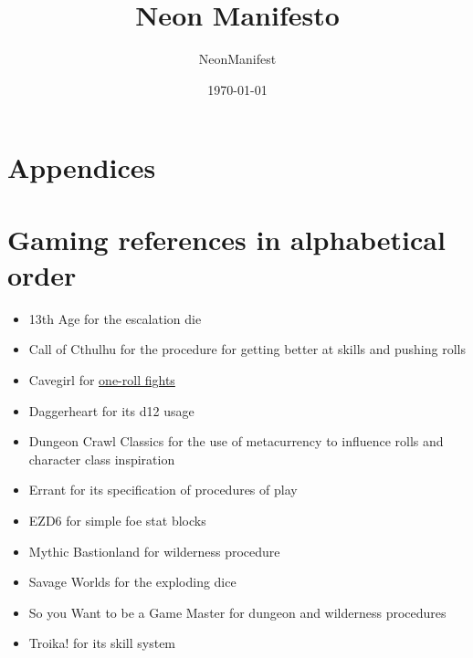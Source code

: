 \documentclass{article}
\title{Neon Manifesto}
\author{NeonManifest}
\date{\today}
\begin{document}
\maketitle

\tableofcontents









\appendix
\section*{Appendices}
\section{Gaming references in alphabetical order}
\begin{itemize}
    \item 13th Age for the escalation die
    \item Call of Cthulhu for the procedure for getting better at skills and pushing rolls
    \item Cavegirl for \href{https://cavegirlgames.blogspot.com/2018/03/one-roll-fights.html}{one-roll fights}
    \item Daggerheart for its d12 usage
    \item Dungeon Crawl Classics for the use of metacurrency to influence rolls and character 
          class inspiration
    \item Errant for its specification of procedures of play
    \item EZD6 for simple foe stat blocks
    \item Mythic Bastionland for wilderness procedure
    \item Savage Worlds for the exploding dice
    \item So you Want to be a Game Master for dungeon and wilderness procedures
    \item Troika! for its skill system
\end{itemize}
\end{document}
